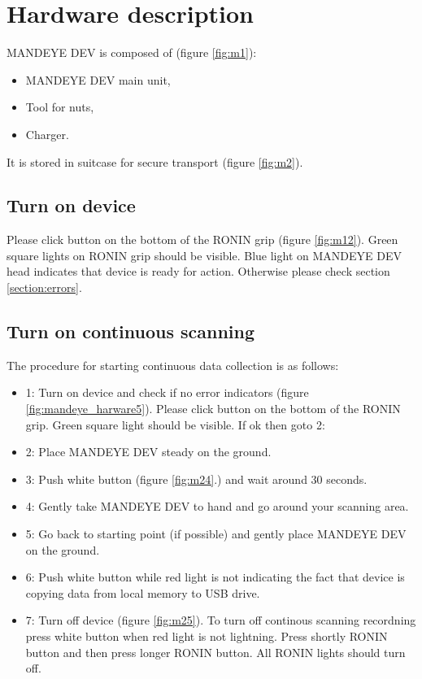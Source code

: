 \chapter{Hardware description}
MANDEYE DEV is composed of (figure \ref{fig:m1}):
\begin{itemize}
	\item MANDEYE DEV main unit,
	\item Tool for nuts,
	\item Charger.
\end{itemize}
It is stored in suitcase for secure transport (figure \ref{fig:m2}).

\section{Turn on device}
Please click button on the bottom of the RONIN grip (figure \ref{fig:m12}). 
Green square lights on RONIN grip should be visible.
Blue light on MANDEYE DEV head indicates that device is ready for action.
Otherwise please check section \ref{section:errors}.

\section{Turn on continuous scanning}
The procedure for starting continuous data collection is as follows:
\begin{itemize}
	\item 1: Turn on device and check if no error indicators (figure \ref{fig:mandeye_harware5}). 
	Please click button on the bottom of the RONIN grip. 
	Green square light should be visible.
	If ok then goto 2:
	\item 2: Place MANDEYE DEV steady on the ground.
	\item 3: Push white button (figure \ref{fig:m24}.) and wait around 30 seconds.
	\item 4: Gently take MANDEYE DEV to hand and go around your scanning area.
	\item 5: Go back to starting point (if possible) and gently place MANDEYE DEV on the ground.
	\item 6: Push white button while red light is not indicating the fact that device is copying data from local memory to USB drive.
	\item 7: Turn off device (figure \ref{fig:m25}). To turn off continous scanning recordning press white button when red light is not lightning. Press shortly RONIN button and then press longer RONIN button. All RONIN lights should turn off.
\end{itemize}

